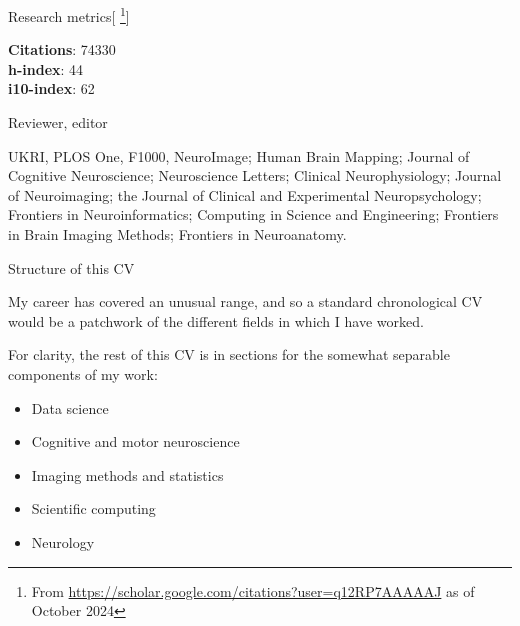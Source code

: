 \documentclass{cv}
\begin{document}
\begin{cvSection}{Research metrics}[
    \footnote{ From
    \url{https://scholar.google.com/citations?user=q12RP7AAAAAJ} as of October 2024}]

{\bf Citations}: 74330 \\
{\bf h-index}: 44 \\
{\bf i10-index}: 62

\end{cvSection}

\begin{cvSection}{Reviewer, editor}

    UKRI, PLOS One, F1000, NeuroImage; Human Brain Mapping; Journal of Cognitive
    Neuroscience; Neuroscience Letters; Clinical Neurophysiology; Journal of
    Neuroimaging; the Journal of Clinical and Experimental Neuropsychology;
    Frontiers in Neuroinformatics; Computing in Science and Engineering;
    Frontiers in Brain Imaging Methods; Frontiers in Neuroanatomy.

\end{cvSection}

\begin{cvSection}{Structure of this CV}

        My career has covered an unusual range, and so a standard chronological
        CV would be a patchwork of the different fields in which I have worked.

        For clarity, the rest of this CV is in sections for the somewhat
        separable components of my work:

        \begin{itemize}
            \item Data science
            \item Cognitive and motor neuroscience
            \item Imaging methods and statistics
            \item Scientific computing
            \item Neurology
        \end{itemize}

\end{cvSection}
\end{document}
